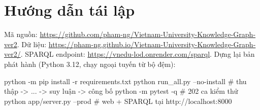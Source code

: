 \documentclass[12pt,a4paper]{article}
\begin{document}
\clearpage
{}
{\small

\setlength{\bibsep}{2pt}
}

\appendix
\section{Hướng dẫn tái lập}\label{app:repro}
Mã nguồn: \url{https://github.com/pham-ng/Vietnam-University-Knowledge-Graph-ver2}. Dữ liệu:
\url{https://pham-ng.github.io/Vietnam-University-Knowledge-Graph-ver2/}. SPARQL endpoint:
\url{https://vnedu-lod.onrender.com/sparql}. Dựng lại bản phát hành (Python 3.12, chạy ngoại tuyến từ bộ đệm):
\begin{code}
python -m pip install -r requirements.txt
python run_all.py --no-install     # thu thập -> ... -> suy luận -> công bố
python -m pytest -q                # 202 ca kiểm thử
python app/server.py --prod        # web + SPARQL tại http://localhost:8000
\end{code}
\end{document}
